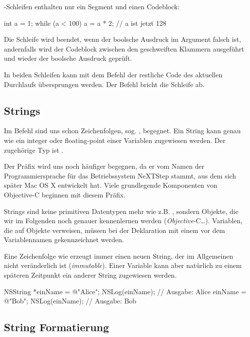 \documentclass[parskip=half, final]{scrreprt}
\begin{document}
-Schleifen enthalten nur ein Segment und einen Codeblock:

\begin{objclst}
int a = 1;
while (a < 100) {
    a = a * 2;
}
// a ist jetzt 128
\end{objclst}

Die Schleife wird beendet, wenn der boolsche Ausdruck im Argument falsch ist, andernfalls wird der Codeblock zwischen den geschweiften Klammern ausgeführt und wieder der boolsche Ausdruck geprüft.

In beiden Schleifen kann mit dem Befehl  der restliche Code des aktuellen Durchlaufs übersprungen werden. Der Befehl  bricht die Schleife ab.

\subsection{Strings}

Im  Befehl sind uns schon Zeichenfolgen, sog. , begegnet. Ein String kann genau wie ein integer oder floating-point einer Variablen zugewiesen werden. Der zugehörige Typ ist .

Der Präfix  wird uns noch häufiger begegnen, da er vom Namen der Programmiersprache für das Betriebssystem NeXTStep stammt, aus dem sich später Mac OS X entwickelt hat. Viele grundlegende Komponenten von Objective-C beginnen mit diesem Präfix.

Strings sind keine primitiven Datentypen mehr wie z.B. , sondern Objekte, die wir im Folgenden noch genauer kennenlernen werden (\emph{Objective}-C…). Variablen, die auf Objekte verweisen, müssen bei der Deklaration mit einem \objc{*} vor dem Variablennamen gekennzeichnet werden.

Eine Zeichenfolge wie  erzeugt immer einen neuen String, der im Allgemeinen nicht veränderlich ist (\emph{immutable}). Einer Variable kann aber natürlich zu einem späteren Zeitpunkt ein anderer String zugewiesen werden.

\begin{objclst}
NSString *einName = @"Alice";
NSLog(einName); // Ausgabe: Alice
einName = @"Bob";
NSLog(einName); // Ausgabe: Bob
\end{objclst}

\subsection{String Formatierung}\label{sec:stringformat}
\end{document}
